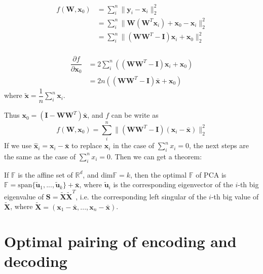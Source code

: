 	\begin{align*}
		f(\mathbf W,\mathbf x_0)&=\sum_i^n\|\mathbf y_i-\mathbf x_i\|_2^2\\
		&=\sum_i^n\|\mathbf W(\mathbf W^T\mathbf x_i)+\mathbf x_0-\mathbf x_i\|_2^2\\
		&=\sum_i^n\|(\mathbf W\mathbf W^T-\mathbf I)\mathbf x_i+\mathbf x_0\|_2^2\\
	\end{align*}
	
	\begin{align*}
	\dfrac{\partial f}{\partial \mathbf x_0}&=2\sum_i^n((\mathbf W\mathbf W^T-\mathbf I)\mathbf x_i+\mathbf x_0)\\
	&=2n((\mathbf W\mathbf W^T-\mathbf I)\bar{\mathbf x}+\mathbf x_0)
	\end{align*}
	where $\tilde{\mathbf x}=\dfrac 1n\sum_i^n \mathbf x_i$.
	
	Thus $\mathbf x_0=(\mathbf I-\mathbf W\mathbf W^T)\bar{\mathbf x}$, and $f$ can be write as 
	\begin{equation}
	f(\mathbf W,\mathbf x_0)
	=\sum_i^n\|(\mathbf W\mathbf W^T-\mathbf I)(\mathbf x_i-\bar{\mathbf x})\|_2^2
	\end{equation}
	If we use $\hat{\mathbf x}_i=\mathbf x_i -\bar{\mathbf x}$ to replace $\mathbf x_i$ in the case of $\sum_i^n x_i=0$, the next steps are the same as the case of $\sum_i^n x_i= 0$. Then we can get a theorem:
	\begin{theorem}
		If $\mathbb F$ is the affine set of $\mathbb R^d$, and $\text{dim}\mathbb F = k$, then the optimal $\mathbb F$ of PCA is $\mathbb F= \text{span}\{\tilde{\mathbf u}_1,...,\tilde{\mathbf u}_k \}+\bar{\mathbf x}$, where $\tilde{\mathbf u}_i$ is the corresponding eigenvector of the $i$-th big eigenvalue of $\mathbf S=\tilde{\mathbf X}\tilde{\mathbf X}^T$, i.e. the corresponding left singular of the $i$-th big value of $\tilde{\mathbf X}$, where $\tilde{\mathbf X}=(\mathbf x_1-\bar{\mathbf x},...,\mathbf x_n-\bar{\mathbf x})$.
	\end{theorem}

\section{Optimal pairing of encoding and decoding}
